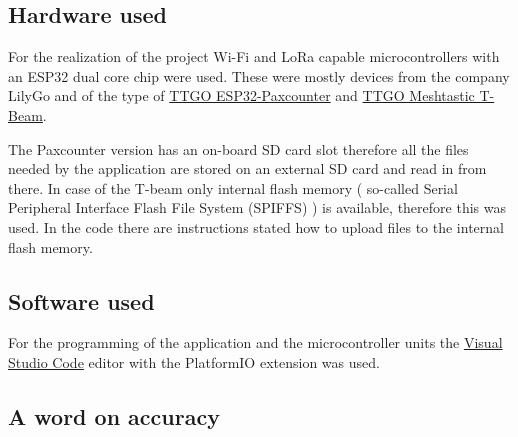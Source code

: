 \documentclass[11pt,a4paper]{article}
\numberwithin{equation}{section}   %
\numberwithin{figure}{section}     %
\numberwithin{table}{section}      %
\begin{document}
\subsection{Hardware used}

For the realization of the project Wi-Fi and LoRa capable microcontrollers with an ESP32 dual core chip were used. These were mostly devices from the company LilyGo and of the type of \href{https://www.aliexpress.com/item/32915894264.html?spm=a2g0o.detail.1000060.2.43398dd6jrQzfD&gps-id=pcDetailBottomMoreThisSeller&scm=1007.13339.169870.0&scm_id=1007.13339.169870.0&scm-url=1007.13339.169870.0&pvid=7e14ac00-29fd-4fd5-ad6a-08f3264a0d6f&_t=gps-id:pcDetailBottomMoreThisSeller,scm-url:1007.13339.169870.0,pvid:7e14ac00-29fd-4fd5-ad6a-08f3264a0d6f,tpp_buckets:668\%230\%23131923\%2335_668\%23888\%233325\%2314_668\%232846\%238108\%231977_668\%232717\%237567\%23944_668\%231000022185\%231000066059\%230_668\%233468\%2315612\%23323}{TTGO ESP32-Paxcounter}
and 
\href{https://www.aliexpress.com/item/4001178678568.html?spm=a2g0o.detail.100009.5.1bf16608x35S1b&gps-id=pcDetailLeftTopSell&scm=1007.13482.95643.0&scm_id=1007.13482.95643.0&scm-url=1007.13482.95643.0&pvid=8422c7ea-a8d6-46a8-b6ed-1d913000ef9f&_t=gps-id:pcDetailLeftTopSell,scm-url:1007.13482.95643.0,pvid:8422c7ea-a8d6-46a8-b6ed-1d913000ef9f,tpp_buckets:668\%230\%23131923\%231_668\%23808\%234094\%23267_668\%23888\%233325\%238_668\%234328\%2319934\%23620_668\%232846\%238114\%23705_668\%232717\%237563\%23586_668\%231000022185\%231000066058\%230_668\%233480\%2315683\%2363}{TTGO Meshtastic T-Beam}.

The Paxcounter version has an on-board SD card slot therefore all the files needed by the application are stored on an external SD card and read in from there. In case of the T-beam only internal flash memory ( so-called Serial Peripheral Interface Flash File System (SPIFFS) ) is available, therefore this was used. In the code there are instructions stated how to upload files to the internal flash memory.


\subsection{Software used}

For the programming of the application and the microcontroller units the \href{https://docs.platformio.org/en/latest/integration/ide/vscode.html}{Visual Studio Code} editor with the PlatformIO extension was used.


\subsection{A word on accuracy}
\end{document}
